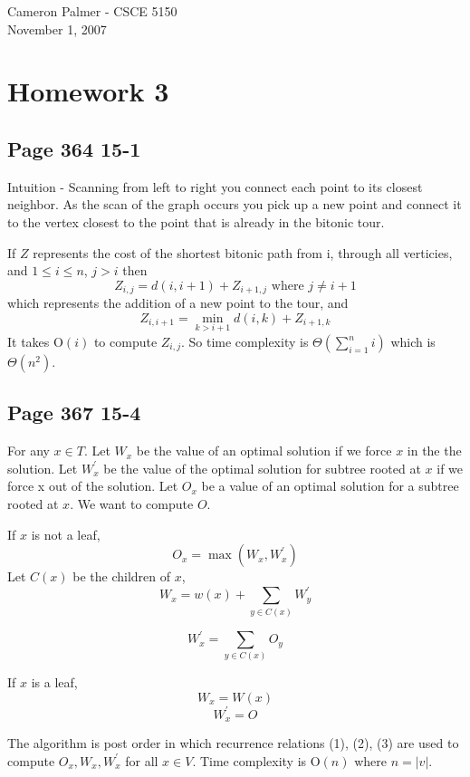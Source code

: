 \documentclass[12pt,twoside,letterpaper]{article}
\begin{document}
Cameron Palmer - CSCE 5150\\
November 1, 2007
\section*{Homework 3}
\subsection*{Page 364 15-1}
Intuition - Scanning from left to right you connect each point to its closest neighbor. As the scan of the graph occurs you pick up a new point and connect it to the vertex closest to the point that is already in the bitonic tour.

If $Z$ represents the cost of the shortest bitonic path from i, through all verticies, and $1 \le i \le n$, $j > i$ then
$$Z_{i,j} = d(i,i+1) + Z_{i+1,j} \textrm{ where } j \ne i+1$$
which represents the addition of a new point to the tour, and
$$Z_{i,i+1} = \min_{k>i+1}{d(i,k) + Z_{i+1,k}}$$
It takes $\textrm{O}(i)$ to compute $Z_{i,j}$. So time complexity is $\Theta(\sum_{i=1}^n i)$ which is $\Theta(n^2)$.

\subsection*{Page 367 15-4}
For any $x \in T$. Let $W_x$ be the value of an optimal solution if we force $x$ in the the solution. Let $W_x^\prime$ be the value of the optimal solution for subtree rooted at $x$ if we force x out of the solution. Let $O_x$ be a value of an optimal solution for a subtree rooted at $x$. We want to compute $O$.

If $x$ is not a leaf,
\begin{equation}
O_x = \max(W_x,W_x^\prime)
\end{equation}
Let $C(x)$ be the children of $x$,
\begin{equation}
W_x = w(x) + \sum_{y \in C(x)} W_y^\prime
\end{equation}

\begin{equation}
W_x^\prime = \sum_{y \in C(x)} O_y
\end{equation}

If $x$ is a leaf,
$$W_x= W(x)$$
$$W_x^\prime = O$$

The algorithm is post order in which recurrence relations (1), (2), (3) are used to compute $O_x, W_x, W_x^\prime$ for all $x \in V$. Time complexity is $\textrm{O}(n)$ where $n = |v|$.
\end{document}
